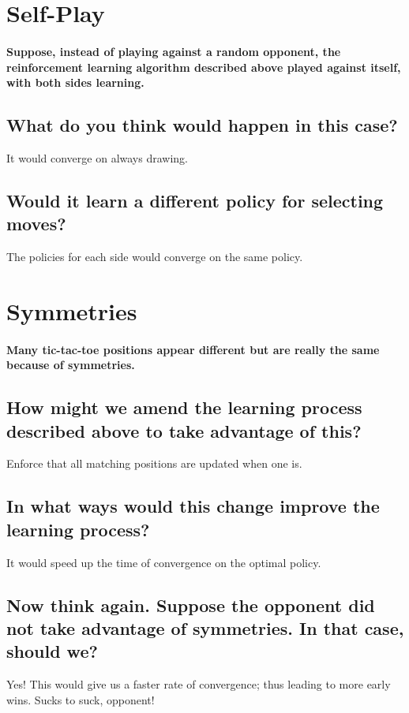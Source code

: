\documentclass{article}
\begin{document}
\maketitle

\section{Self-Play}
\paragraph{Suppose, instead of playing against a random opponent, the reinforcement learning algorithm described above played against itself, with both sides learning.}
\subsection{What do you think would happen in this case?}
It would converge on always drawing.
\subsection{Would it learn a different policy for selecting moves?}
The policies for each side would converge on the same policy.

\section{Symmetries}
\paragraph{Many tic-tac-toe positions appear different but are really the same because of symmetries.}
\subsection{How might we amend the learning process described above to take advantage of this?}
Enforce that all matching positions are updated when one is.
\subsection{In what ways would this change improve the learning process?}
It would speed up the time of convergence on the optimal policy.
\subsection{Now think again. Suppose the opponent did not take advantage of symmetries. In that case, should we?}
Yes! This would give us a faster rate of convergence; thus leading to more early wins. Sucks to suck, opponent!
\end{document}
